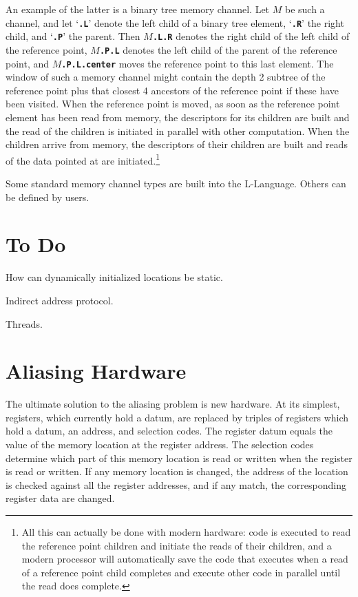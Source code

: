 \documentclass[12pt]{article}
\newcommand{\TT}[1]{{\tt \bfseries #1}}
\begin{document}
An example of the latter is a binary tree memory channel.
Let $M$ be such a channel, and let `\TT{.L}' denote the left
child of a binary tree element, `\TT{.R}' the right child, and
`\TT{.P}' the parent.  Then $M\!$\TT{.L.R} denotes the right
child of the left child of the reference point, $M\!$\TT{.P.L}
denotes the left child of the parent of the reference point,
and $M\!$\TT{.P.L.center} moves the reference point to this last element.
The window of such a memory channel might contain the depth 2
subtree of the reference point plus that closest 4 ancestors of the
reference point if these have been visited.  When the reference
point is moved, as soon as the reference point element has been
read from memory, the descriptors for its children are built and
the read of the children is initiated in parallel with other
computation.  When the children arrive from memory, the descriptors
of their children are built and reads of the data pointed at
are initiated.\footnote{All this can actually be done with modern
hardware: code is executed to read the reference point children and initiate the
reads of their children, and a modern processor will automatically
save the code that
executes when a read of a reference point child completes and execute
other code in parallel until the read does complete.}

Some standard memory channel types are built into the L-Language.
Others can be defined by users.

\section{To Do}

How can dynamically initialized locations be static.

Indirect address protocol.
\label{INDIRECT-ADDRESS-PROTOCOL}

Threads.
\label{THREADS}

\appendix

\section{Aliasing Hardware}
\label{ALIASING-HARDWARE}

The ultimate solution to the aliasing problem is new hardware.
At its simplest, registers, which currently hold a datum,
are replaced by triples of registers which hold a datum,
an address, and selection codes.  The register datum equals the value
of the memory location at the register address.  The selection
codes determine which part of this memory location is read or written
when the register is read or written.  If any memory location is
changed, the address of the location is checked against all the
register addresses, and if any match, the corresponding register
data are changed.
\end{document}
